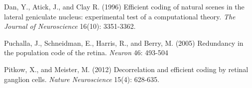 \documentclass[12pt]{article}
\begin{document}
\newpage
\begin{thebibliography}{9}


 Dan, Y., Atick, J., and Clay R. (1996) Efficient coding of natural scenes in the lateral geniculate nucleus: experimental test of a computational theory. \textit{The Journal of Neuroscience} 16(10): 3351-3362.

 Puchalla, J., Schneidman, E., Harris, R., and Berry, M. (2005) Redundancy in the population code of the retina. \textit{Neuron} 46: 493-504

 Pitkow, X., and Meister, M. (2012) Decorrelation and efficient coding by retinal ganglion cells. \textit{Nature Neuroscience} 15(4): 628-635.


\end{thebibliography}
\end{document}
